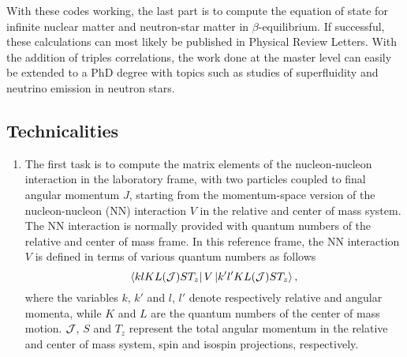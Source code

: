 With these codes working, the last part is to compute the equation of state for infinite nuclear matter  and neutron-star
matter in $\beta$-equilibrium. If successful, these calculations can most likely be published in Physical Review Letters.
With the addition of triples correlations, the work done at the master level can easily be extended to a PhD degree
with topics such as studies of superfluidity and neutrino emission in neutron stars.

\subsection*{Technicalities}
\begin{enumerate} 
\item 
The first task is to compute the matrix elements of the nucleon-nucleon interaction in the laboratory frame,
with two particles coupled to final angular momentum $J$, 
starting from the momentum-space version of the 
nucleon-nucleon (NN) interaction $V$ in the relative and center of mass system.
The NN interaction is normally provided with quantum numbers of the relative and center of mass frame.
In this reference frame, 
the NN interaction $V$ 
is defined in terms of various quantum numbers as follows
\begin{equation}
\left\langle klKL({\cal J})S T_z\right |
      V\left | k'l'KL({\cal J})S T_z \right\rangle,
\end{equation}
where the variables $k$, $k'$ and $l$, $l'$
denote respectively relative and angular momenta,
while
$K$ and $L$ are the quantum numbers of the center of mass
motion. ${\cal J}$, $S$ and $T_z$ represent the total angular
momentum in the relative and center of mass system, spin and isospin projections,
respectively. 


\end{enumerate}

